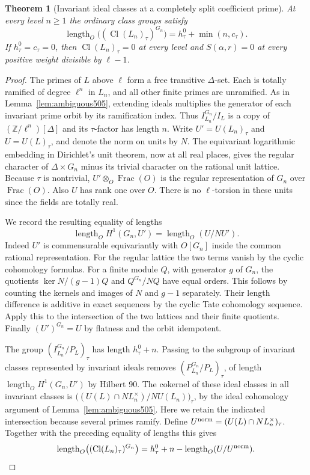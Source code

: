 \documentclass[a4paper,11pt]{article}
\newtheorem{theorem}[proposition]{Theorem}
\theoremstyle{definition}
\theoremstyle{remark}
\newcommand{\ZZ}{\mathbb Z}\newcommand{\ord}{\operatorname{ord}}
\numberwithin{equation}{section}
\newcommand{\Cl}{\operatorname{Cl}}
\begin{document}
\begin{theorem}[Invariant ideal classes at a completely split coefficient prime]\leavevmode
\label{thm:splitamb506}
At every level \(n\ge1\) the ordinary class groups satisfy
\[
 \operatorname{length}_O\bigl((\Cl(L_n)_\tau)^{G_n}\bigr)
                         =h^0_\tau+\min(n,c_\tau).
\]
If \(h^0_\tau=c_\tau=0\), then \(\Cl(L_n)_\tau=0\) at every
level and \(S(\alpha,r)=0\) at every positive weight divisible
by \(\ell-1\).
\end{theorem}
\begin{proof}
The primes of \(L\) above \(\ell\) form a free transitive
\(\Delta\)-set. Each is totally ramified of degree \(\ell^n\)
in \(L_n\), and all other finite primes are unramified. As in
Lemma~\ref{lem:ambiguous505}, extending ideals multiplies the
generator of each invariant prime orbit by its ramification
index. Thus \(I_{L_n}^{G_n}/I_L\) is a copy of
\((\ZZ/\ell^n)[\Delta]\) and its \(\tau\)-factor has length \(n\).
Write \(U'=U(L_n)_\tau\) and \(U=U(L)_\tau\), and denote
the norm on units by \(N\). The equivariant logarithmic
embedding in Dirichlet's unit theorem, now at all real places,
gives the regular character of \(\Delta\times G_n\) minus its
trivial character on the rational unit lattice. Because \(\tau\)
is nontrivial, \(U'\otimes_O\operatorname{Frac}(O)\) is the
regular representation of \(G_n\) over \(\operatorname{Frac}(O)\).
Also \(U\) has rank one over \(O\). There is no \(\ell\)-torsion
in these units since the fields are totally real.

We record the resulting equality of lengths
\[
     \operatorname{length}_O H^1(G_n,U')
                 =\operatorname{length}_O(U/NU').
\]
Indeed \(U'\) is commensurable equivariantly with \(O[G_n]\)
inside the common rational representation. For the regular
lattice the two terms vanish by the cyclic cohomology formulas.
For a finite module \(Q\), with generator \(g\) of \(G_n\),
the quotients \(\ker N/(g-1)Q\) and \(Q^{G_n}/NQ\) have equal
orders. This follows by counting the kernels and images of
\(N\) and \(g-1\) separately. Their length difference is
additive in exact sequences by the cyclic Tate cohomology
sequence. Apply this to the intersection of the two lattices
and their finite quotients. Finally \((U')^{G_n}=U\) by
flatness and the orbit idempotent.

The group \((I_{L_n}^{G_n}/P_L)_\tau\) has length \(h^0_\tau+n\).
Passing to the subgroup of invariant classes represented by
invariant ideals removes \((P_{L_n}^{G_n}/P_L)_\tau\), of
length \(\operatorname{length}_O H^1(G_n,U')\) by Hilbert 90.
The cokernel of these ideal classes in all invariant classes is
\(\big((U(L)\cap NL_n^\times)/NU(L_n)\big)_\tau\), by the
ideal cohomology argument of Lemma~\ref{lem:ambiguous505}.
Here we retain the indicated intersection because several
primes ramify. Define \(U^{\rm norm}=(U(L)\cap NL_n^\times)_\tau\).
Together with the preceding equality of lengths this gives
\[
 \operatorname{length}_O\bigl((\Cl(L_n)_\tau)^{G_n}\bigr)
             = h^0_\tau+n-\operatorname{length}_O(U/U^{\rm norm}).
\]


\end{proof}
\end{document}
